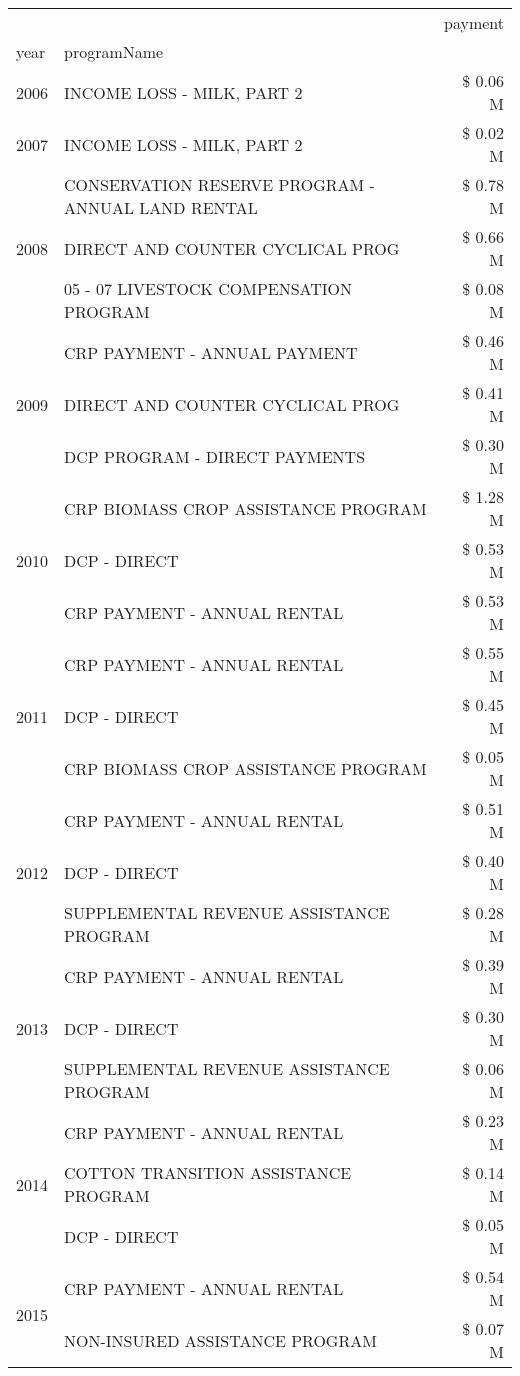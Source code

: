 \begin{tabular}{llr}
\toprule
 &  & payment \\
year & programName &  \\
\midrule
2006 & INCOME LOSS - MILK, PART 2 & \$ 0.06 M \\
\cline{1-3}
2007 & INCOME LOSS - MILK, PART 2 & \$ 0.02 M \\
\cline{1-3}
\multirow[t]{3}{*}{2008} & CONSERVATION RESERVE PROGRAM - ANNUAL LAND RENTAL & \$ 0.78 M \\
 & DIRECT AND COUNTER CYCLICAL PROG & \$ 0.66 M \\
 & 05 - 07 LIVESTOCK COMPENSATION PROGRAM & \$ 0.08 M \\
\cline{1-3}
\multirow[t]{3}{*}{2009} & CRP PAYMENT - ANNUAL PAYMENT & \$ 0.46 M \\
 & DIRECT AND COUNTER CYCLICAL PROG & \$ 0.41 M \\
 & DCP PROGRAM - DIRECT PAYMENTS & \$ 0.30 M \\
\cline{1-3}
\multirow[t]{3}{*}{2010} & CRP BIOMASS CROP ASSISTANCE PROGRAM & \$ 1.28 M \\
 & DCP - DIRECT & \$ 0.53 M \\
 & CRP PAYMENT - ANNUAL RENTAL & \$ 0.53 M \\
\cline{1-3}
\multirow[t]{3}{*}{2011} & CRP PAYMENT - ANNUAL RENTAL & \$ 0.55 M \\
 & DCP - DIRECT & \$ 0.45 M \\
 & CRP BIOMASS CROP ASSISTANCE PROGRAM & \$ 0.05 M \\
\cline{1-3}
\multirow[t]{3}{*}{2012} & CRP PAYMENT - ANNUAL RENTAL & \$ 0.51 M \\
 & DCP - DIRECT & \$ 0.40 M \\
 & SUPPLEMENTAL REVENUE ASSISTANCE PROGRAM & \$ 0.28 M \\
\cline{1-3}
\multirow[t]{3}{*}{2013} & CRP PAYMENT - ANNUAL RENTAL & \$ 0.39 M \\
 & DCP - DIRECT & \$ 0.30 M \\
 & SUPPLEMENTAL REVENUE ASSISTANCE PROGRAM & \$ 0.06 M \\
\cline{1-3}
\multirow[t]{3}{*}{2014} & CRP PAYMENT - ANNUAL RENTAL & \$ 0.23 M \\
 & COTTON TRANSITION ASSISTANCE PROGRAM & \$ 0.14 M \\
 & DCP - DIRECT & \$ 0.05 M \\
\cline{1-3}
\multirow[t]{3}{*}{2015} & CRP PAYMENT - ANNUAL RENTAL & \$ 0.54 M \\
 & NON-INSURED ASSISTANCE PROGRAM & \$ 0.07 M \\

\end{tabular}
